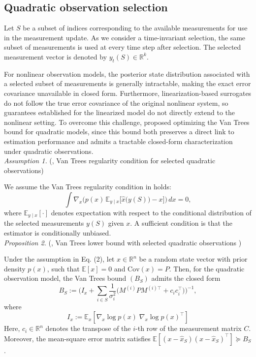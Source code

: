 \documentclass[letterpaper, 10 pt, conference]{ieeeconf}  %
\begin{document}
\subsection{Quadratic observation selection}

Let \(S\) be a subset of indices corresponding to the available measurements for use in the measurement update. As we consider a time-invariant selection, the same subset of measurements is used at every time step after selection. The selected measurement vector is denoted by \(y_t(S)\in\mathbb{R}^k\). 

For nonlinear observation models, the posterior state distribution associated with a selected subset of measurements is generally intractable, making the exact error covariance unavailable in closed form. Furthermore, linearization-based surrogates do not follow the true error covariance of the original nonlinear system, so guarantees established for the linearized model do not directly extend to the nonlinear setting. To overcome this challenge, \cite{c19} proposed optimizing the Van Trees bound \cite{c21} for quadratic models, since this bound both preserves a direct link to estimation performance and admits a tractable closed-form characterization under quadratic observations. \\

\noindent \textit{Assumption 1.} (\cite{c19}, Van Trees regularity condition for selected quadratic observations)

We assume the Van Trees regularity condition in \cite{c19} holds:
\begin{equation}
\label{eq:VT_regularity}
\int
\nabla_x\!\Big(
p(x)\,\mathbb{E}_{y\mid x}\!\big[\hat{x}\big(y(S)\big)-x\big]
\Big)\,dx
= 0,
\end{equation}
where \(\mathbb{E}_{y\mid x}[\cdot]\) denotes expectation with respect to the conditional distribution of the selected measurements \(y(S)\) given \(x\). A sufficient condition is that the estimator is conditionally unbiased. \\

\noindent \textit{Proposition 2.} (\cite{c19}, Van Trees lower bound with selected quadratic observations )

Under the assumption in Eq. (2), let \(x\in\mathbb{R}^n\) be a random state vector with prior density \(p(x)\), such that \(\mathbb{E}[x]=0\) and \(\mathrm{Cov}(x)=P\). Then, for the quadratic observation model, the Van Trees bound $(B_S)$ admits the closed form
\begin{equation}
B_S
:=
\Big(I_x+\sum_{i\in S}\frac{1}{\sigma_i^2}
\Big(M^{(i)} P M^{(i)\top}+c_i c_i^\top\Big)\Big)^{-1},
\end{equation}
where
\begin{equation}
I_x:= \mathbb{E}_{x}\!\left[\nabla_x \log p(x)\;\nabla_x \log p(x)^\top\right]
\end{equation}
Here, \(c_i \in \mathbb{R}^n \) denotes the transpose of the \(i\)-th row of the measurement matrix \(C\). Moreover, the mean-square error matrix satisfies $\mathbb{E}\!\left[(x-\hat{x}_S)(x-\hat{x}_S)^\top\right]
\succeq
B_S$. \\
\end{document}

